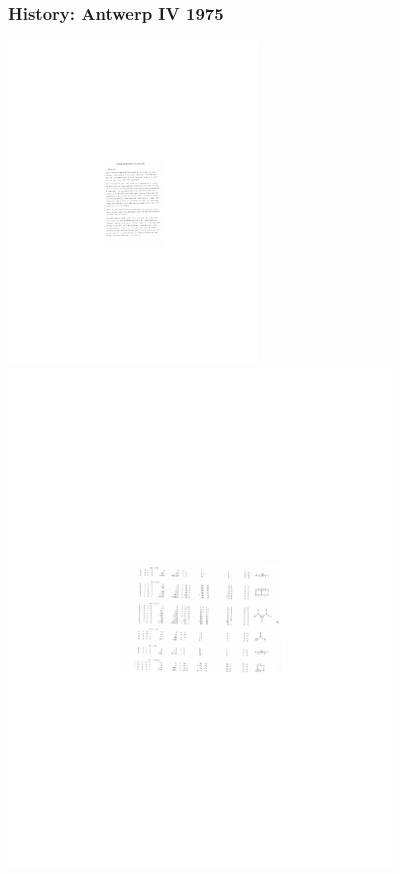 \documentclass[xcolor=dvipsnames]{beamer}
\theoremstyle{plain}
\begin{document}
\begin{frame}[plain]
\frametitle{History: Antwerp IV 1975} \pause

\vspace{-0.15in}
\begin{center}
\includegraphics[width=2.6in]{antwerpiv.pdf} \includegraphics[width=4in]{antwerpiv1.pdf}
\end{center}
\end{frame}
\end{document}

